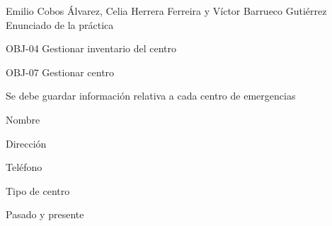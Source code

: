 {Emilio Cobos Álvarez, Celia Herrera Ferreira y Víctor Barrueco Gutiérrez}
{Enunciado de la práctica}
{OBJ-04 Gestionar inventario del centro \par
OBJ-07 Gestionar centro}
{}
{Se debe guardar información relativa a cada centro de emergencias}
{
\item{Nombre}
\item{Dirección}
\item{Teléfono}
\item{Tipo de centro}
}
{Pasado y presente}

